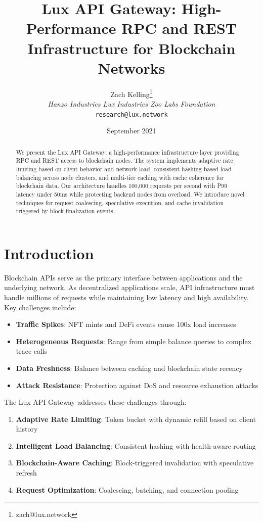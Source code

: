 \documentclass[11pt,a4paper]{article}
\title{Lux API Gateway: High-Performance RPC and REST\\Infrastructure for Blockchain Networks}
\author{Zach Kelling\thanks{zach@lux.network} \\ \textit{Hanzo Industries \quad Lux Industries \quad Zoo Labs Foundation} \\ \texttt{research@lux.network}}
\date{September 2021}
\begin{document}
\maketitle

\begin{abstract}
We present the Lux API Gateway, a high-performance infrastructure layer providing RPC and REST access to blockchain nodes. The system implements adaptive rate limiting based on client behavior and network load, consistent hashing-based load balancing across node clusters, and multi-tier caching with cache coherence for blockchain data. Our architecture handles 100,000 requests per second with P99 latency under 50ms while protecting backend nodes from overload. We introduce novel techniques for request coalescing, speculative execution, and cache invalidation triggered by block finalization events.
\end{abstract}

\section{Introduction}

Blockchain APIs serve as the primary interface between applications and the underlying network. As decentralized applications scale, API infrastructure must handle millions of requests while maintaining low latency and high availability. Key challenges include:

\begin{itemize}
    \item \textbf{Traffic Spikes}: NFT mints and DeFi events cause 100x load increases
    \item \textbf{Heterogeneous Requests}: Range from simple balance queries to complex trace calls
    \item \textbf{Data Freshness}: Balance between caching and blockchain state recency
    \item \textbf{Attack Resistance}: Protection against DoS and resource exhaustion attacks
\end{itemize}

The Lux API Gateway addresses these challenges through:

\begin{enumerate}
    \item \textbf{Adaptive Rate Limiting}: Token bucket with dynamic refill based on client history
    \item \textbf{Intelligent Load Balancing}: Consistent hashing with health-aware routing
    \item \textbf{Blockchain-Aware Caching}: Block-triggered invalidation with speculative refresh
    \item \textbf{Request Optimization}: Coalescing, batching, and connection pooling
\end{enumerate}
\end{document}
